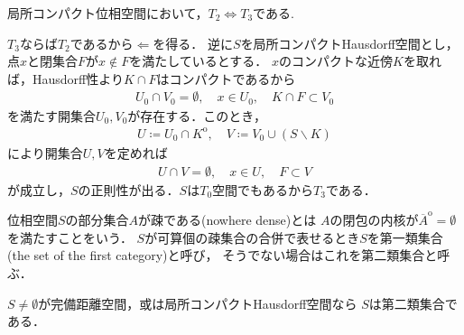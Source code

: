 	\begin{screen}
		\begin{thm}\label{thm:regularity_of_Hausdorff_spaces}
			局所コンパクト位相空間において，$T_2 \Longleftrightarrow T_3$である.
		\end{thm}
	\end{screen}
	
	\begin{prf}
		$T_3$ならば$T_2$であるから$\Longleftarrow$を得る．
		逆に$S$を局所コンパクトHausdorff空間とし，点$x$と閉集合$F$が$x \notin F$を満たしているとする．
		$x$のコンパクトな近傍$K$を取れば，Hausdorff性より$K \cap F$はコンパクトであるから
		\begin{align}
			U_0 \cap V_0 = \emptyset, \quad x \in U_0,  \quad K \cap F \subset V_0
		\end{align}
		を満たす開集合$U_0,V_0$が存在する．このとき，
		\begin{align}
			U \coloneqq U_0 \cap K^{\mathrm{o}},
			\quad V \coloneqq V_0 \cup (S \backslash K)
		\end{align}
		により開集合$U,V$を定めれば
		\begin{align}
			U \cap V = \emptyset,
			\quad x \in U,
			\quad F \subset V
		\end{align}
		が成立し，$S$の正則性が出る．$S$は$T_0$空間でもあるから$T_3$である．
		\QED
	\end{prf}
	
	\begin{screen}
		\begin{dfn}
			位相空間$S$の部分集合$A$が疎である(nowhere dense)とは
			$A$の閉包の内核が$\overline{A}^{\mathrm{o}} = \emptyset$を満たすことをいう．
			$S$が可算個の疎集合の合併で表せるとき$S$を第一類集合(the set of the first category)と呼び，
			そうでない場合はこれを第二類集合と呼ぶ．
		\end{dfn}
	\end{screen}
	
	\begin{screen}
		\begin{thm}[Baire]\label{thm:Baire_category_theorem}
			$S \neq \emptyset$が完備距離空間，或は局所コンパクトHausdorff空間なら
			$S$は第二類集合である．
		\end{thm}
	\end{screen}
	
